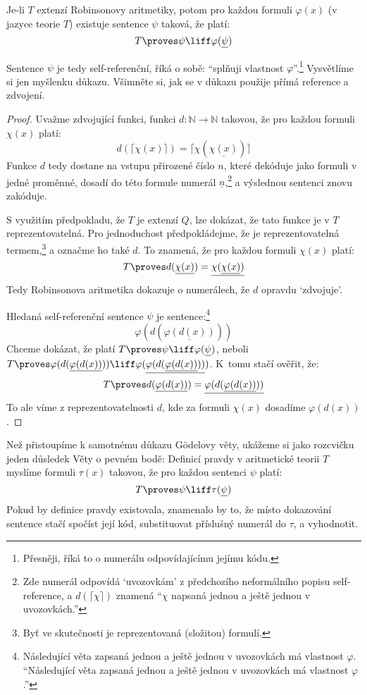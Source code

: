 \begin{theorem}
Je-li $T$ extenzí Robinsonovy aritmetiky, potom pro každou formuli $\varphi(x)$ (v jazyce teorie $T$) existuje sentence $\psi$ taková, že platí: 
$$
T\proves \psi \liff \varphi(\underline{\psi})
$$
\end{theorem}
Sentence $\psi$ je tedy \alert{self-referenční}, říká o sobě: ``splňuji vlastnost $\varphi$''.\footnote{Přesněji, říká to o numerálu odpovídajícímu jejímu kódu.} Vysvětlíme si jen myšlenku důkazu. Všimněte si, jak se v důkazu použije přímá reference a zdvojení.
\begin{proof} Uvažme \alert{zdvojující funkci}, funkci $d\colon\mathbb N\to\mathbb N$ takovou, že pro každou formuli $\chi(x)$ platí:
$$
d(\lceil \chi(x)\rceil)=\lceil\chi(\underline{\chi(x)})\rceil
$$
Funkce $d$ tedy dostane na vstupu přirozené číslo $n$, které dekóduje jako formuli v jedné proměnné, dosadí do této formule numerál $\underline{n}$,\footnote{Zde \alert{numerál} odpovídá `uvozovkám' z předchozího neformálního popisu self-reference, a $d(\lceil\chi\rceil)$ znamená ``$\chi$ napsaná jednou a ještě jednou v uvozovkách.''} a výslednou sentenci znovu zakóduje.

S využitím předpokladu, že $T$ je extenzí $Q$, lze dokázat, že tato funkce je v $T$ \alert{reprezentovatelná}. Pro jednoduchost předpokládejme, že je reprezentovatelná termem,\footnote{Byť ve skutečnosti je reprezentovaná (složitou) formulí.} a označme ho také $d$. To znamená, že pro každou formuli $\chi(x)$ platí:
$$
T\proves d(\underline{\chi(x)})=\underline{\chi(\underline{\chi(x)})}
$$
Tedy Robinsonova aritmetika dokazuje \alert{o numerálech}, že $d$ opravdu `zdvojuje'.

Hledaná self-referenční sentence $\psi$ je sentence:\footnote{Následující věta zapsaná jednou a ještě jednou v uvozovkách má vlastnost $\varphi$. ``Následující věta zapsaná jednou a ještě jednou v uvozovkách má vlastnost $\varphi$.''}
$$
\varphi(d(\underline{\varphi(d(x))}))
$$
Chceme dokázat, že platí $T\proves \psi \liff \varphi(\underline{\psi})$, neboli $T \proves \varphi(d(\underline{\varphi(d(x))}))\liff\varphi(\underline{\varphi(d(\underline{\varphi(d(x))}))})$. K~tomu stačí ověřit, že:
$$
T \proves d(\underline{\varphi(d(x))})=\underline{\varphi(d(\underline{\varphi(d(x))}))}
$$
To ale víme z reprezentovatelnosti $d$, kde za formuli $\chi(x)$ dosadíme $\varphi(d(x))$.
\end{proof}

Než přistoupíme k samotnému důkazu Gödelovy věty, ukážeme si jako rozcvičku jeden důsledek Věty o pevném bodě: \alert{Definicí pravdy} v aritmetické teorii $T$ myslíme formuli $\tau(x)$ takovou, že pro každou sentenci $\psi$ platí: 
$$
T\proves\psi\liff\tau(\underline{\psi})
$$
Pokud by definice pravdy existovala, znamenalo by to, že místo dokazování sentence stačí spočíst její kód, substituovat příslušný numerál do $\tau$, a vyhodnotit.

